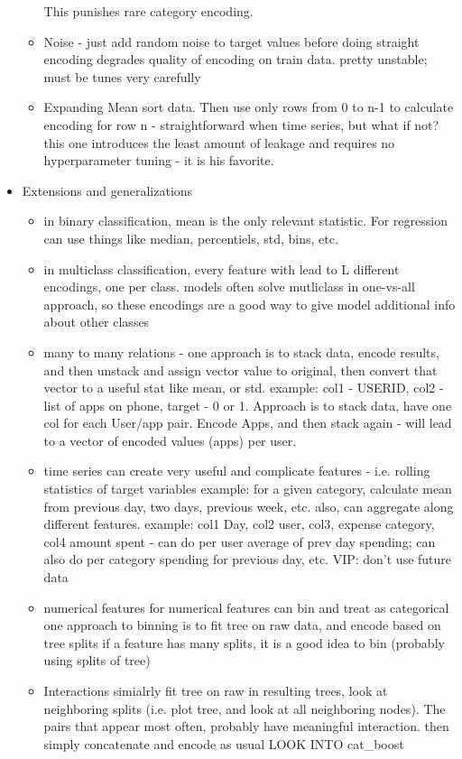 \documentclass[a4paper]{report}
\begin{document}
\begin{itemize}
\begin{itemize}
      \subitem This punishes rare category encoding.
    \item Noise - just add random noise to target values before doing straight encoding
      \subitem degrades quality of encoding on train data.
      \subitem pretty unstable; must be tunes very carefully
    \item Expanding Mean
      \subitem sort data. Then use only rows from 0 to n-1 to calculate encoding for row n
       - straightforward when time series, but what if not?
      \subitem this one introduces the least amount of leakage and requires no hyperparameter tuning - it is his favorite.
    \end{itemize}
  \item Extensions and generalizations
    \begin{itemize}
      \item in binary classification, mean is the only relevant statistic. For regression can use things like median, percentiels, std, bins, etc.
      \item in multiclass classification, every feature with lead to L different encodings, one per class.
	\subitem models often solve mutliclass in one-vs-all approach, so these encodings are a good way to give model additional info about other classes
      \item many to many relations - one approach is to stack data, encode results, and then unstack and assign vector value to original, then convert that vector to a useful stat like mean, or std.
	\subitem example: col1 - USERID, col2 - list of apps on phone, target - 0 or 1. Approach is to stack data, have one col for each User/app pair. Encode Apps, and then stack again - will lead to a vector of encoded values (apps) per user.
      \item time series
	\subitem can create very useful and complicate features - i.e. rolling statistics of target variables
	\subitem example: for a given category, calculate mean from previous day, two days, previous week, etc.
	\subitem also, can aggregate along different features. example: col1 Day, col2 user, col3, expense category, col4 amount spent - can do per user average of prev day spending; can also do per category spending for previous day, etc.
	\subitem VIP: don't use future data
      \item numerical features
	\subitem for numerical features can bin and treat as categorical
	\subitem one approach to binning is to fit tree on raw data, and encode based on tree splits
	\subitem if a feature has many splits, it is a good idea to bin (probably using splits of tree)
      \item Interactions
	\subitem simialrly fit tree on raw
	\subitem in resulting trees, look at neighboring splits (i.e. plot tree, and look at all neighboring nodes). The pairs that appear most often, probably have meaningful interaction.
	\subitem then simply concatenate and encode as usual
	\subitem LOOK INTO cat\_boost
    \end{itemize}
\end{itemize}
\end{document}
